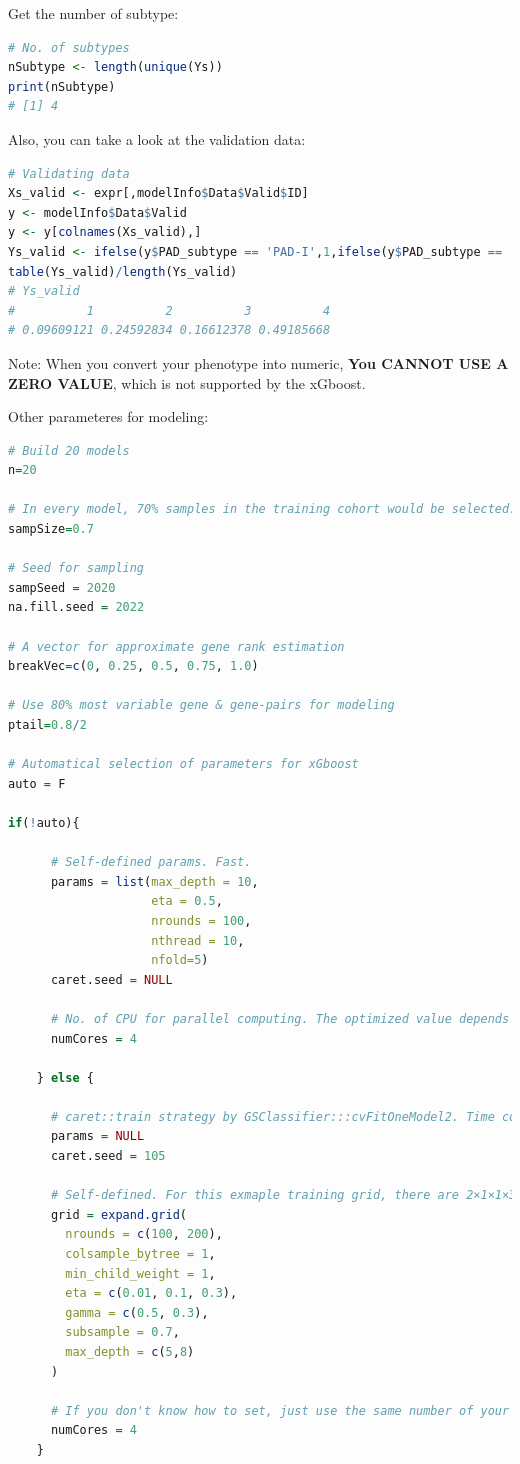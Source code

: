 \documentclass[
  12pt,
]{book}
\begin{document}
Get the number of subtype:

\begin{lstlisting}[language=R]
# No. of subtypes
nSubtype <- length(unique(Ys))
print(nSubtype)
# [1] 4
\end{lstlisting}

Also, you can take a look at the validation data:

\begin{lstlisting}[language=R]
# Validating data
Xs_valid <- expr[,modelInfo$Data$Valid$ID]
y <- modelInfo$Data$Valid
y <- y[colnames(Xs_valid),]
Ys_valid <- ifelse(y$PAD_subtype == 'PAD-I',1,ifelse(y$PAD_subtype == 'PAD-II',2,ifelse(y$PAD_subtype == 'PAD-III',3,ifelse(y$PAD_subtype == 'PAD-IV',4,NA))))
table(Ys_valid)/length(Ys_valid)
# Ys_valid
#          1          2          3          4 
# 0.09609121 0.24592834 0.16612378 0.49185668
\end{lstlisting}

Note: When you convert your phenotype into numeric, \textbf{You CANNOT USE A ZERO VALUE}, which is not supported by the xGboost.

Other parameteres for modeling:

\begin{lstlisting}[language=R]
# Build 20 models
n=20 

# In every model, 70% samples in the training cohort would be selected. 
sampSize=0.7

# Seed for sampling
sampSeed = 2020
na.fill.seed = 2022

# A vector for approximate gene rank estimation
breakVec=c(0, 0.25, 0.5, 0.75, 1.0)
  
# Use 80% most variable gene & gene-pairs for modeling
ptail=0.8/2

# Automatical selection of parameters for xGboost
auto = F

if(!auto){
      
      # Self-defined params. Fast.
      params = list(max_depth = 10,
                    eta = 0.5,
                    nrounds = 100,
                    nthread = 10,
                    nfold=5)
      caret.seed = NULL
      
      # No. of CPU for parallel computing. The optimized value depends on your CPU and RAM
      numCores = 4
      
    } else {
      
      # caret::train strategy by GSClassifier:::cvFitOneModel2. Time consuming
      params = NULL
      caret.seed = 105
      
      # Self-defined. For this exmaple training grid, there are 2×1×1×3×2×1×2=24 grids. Make sure that you have a computer with a powerfull CPU.
      grid = expand.grid(
        nrounds = c(100, 200),
        colsample_bytree = 1,
        min_child_weight = 1,
        eta = c(0.01, 0.1, 0.3),
        gamma = c(0.5, 0.3),
        subsample = 0.7,
        max_depth = c(5,8)
      )
      
      # If you don't know how to set, just use the same number of your subtypes
      numCores = 4 
    }
\end{lstlisting}
\end{document}
